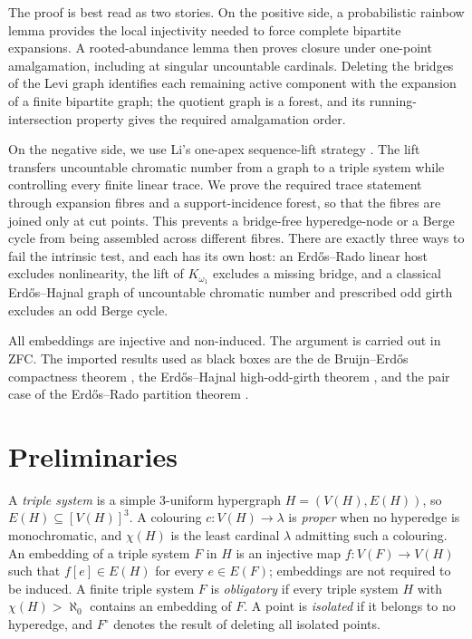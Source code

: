 \documentclass[a4paper,11pt,reqno]{amsart}
\theoremstyle{plain}
\theoremstyle{definition}
\theoremstyle{remark}
\begin{document}
The proof is best read as two stories.  On the positive side, a
probabilistic rainbow lemma provides the local injectivity needed to force
complete bipartite expansions.  A rooted-abundance lemma then proves closure
under one-point amalgamation, including at singular uncountable cardinals.
Deleting the bridges of the Levi graph identifies each remaining active
component with the expansion of a finite bipartite graph; the quotient graph
is a forest, and its running-intersection property gives the required
amalgamation order.

On the negative side, we use Li's one-apex sequence-lift strategy
\citep[Sections~3--4]{li2026}.  The lift transfers uncountable chromatic
number from a graph to a triple system while controlling every finite linear
trace.  We prove the required trace statement through expansion fibres and a
support-incidence forest, so that the fibres are joined only at cut points.
This prevents a bridge-free hyperedge-node or a Berge cycle from being
assembled across different fibres.  There are exactly three ways to fail the
intrinsic test, and each has its own host: an Erdős--Rado linear host excludes
nonlinearity, the lift of $K_{\omega_1}$ excludes a missing bridge, and a
classical Erdős--Hajnal graph of uncountable chromatic number and prescribed
odd girth excludes an odd Berge cycle.

All embeddings are injective and non-induced.  The argument is carried out
in ZFC.  The imported results used as black boxes are the de Bruijn--Erdős
compactness theorem \citep[Theorem~1, pp.~371--373]{debruijn1951}, the
Erdős--Hajnal high-odd-girth theorem
\citep[Theorem~7.4, p.~76]{erdoshajnal1966}, and the pair case of the
Erdős--Rado partition theorem
\citep[Theorem~4(i), formula~(95), p.~471]{erdosrado1956}.

\section{Preliminaries}\label{conventions-and-definitions}

A \emph{triple system} is a simple \(3\)-uniform hypergraph \(H=(V(H),E(H))\), so \(E(H)\subseteq[V(H)]^3\). A colouring \(c:V(H)\to\lambda\) is \emph{proper} when no hyperedge is monochromatic, and \(\chi(H)\) is the least cardinal \(\lambda\) admitting such a colouring. An embedding of a triple system \(F\) in \(H\) is an injective map \(f:V(F)\to V(H)\) such that \(f[e]\in E(H)\) for every \(e\in E(F)\); embeddings are not required to be induced. A finite triple system \(F\) is \emph{obligatory} if every triple system \(H\) with \(\chi(H)>\aleph_0\) contains an embedding of \(F\). A point is \emph{isolated} if it belongs to no hyperedge, and \(F^\circ\) denotes the result of deleting all isolated points.
\end{document}
